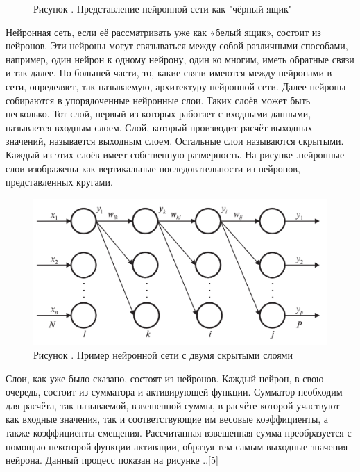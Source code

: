{  \begin{figure}
    \centering
    \def\svgwidth{\textwidth}
    
    \caption*{\gostFont Рисунок \thechaptercntr .\theimagecntr \spc {--} Представление нейронной сети как "чёрный ящик"}
    \label{fig:NNBlackBox}
  \end{figure} \addtocounter{imagecntr}{1}

  \par \redline Нейронная сеть, если её рассматривать уже как «белый ящик», состоит из нейронов. Эти нейроны могут связываться между собой различными способами, например, один нейрон к одному нейрону, один ко многим, иметь обратные связи и так далее. По большей части, то, какие связи имеются между нейронами в сети, определяет, так называемую, архитектуру нейронной сети. Далее нейроны собираются в упорядоченные нейронные слои. Таких слоёв может быть несколько. Тот слой, первый из которых работает с входными данными, называется входным слоем. Слой, который производит расчёт выходных значений, называется выходным слоем. Остальные слои называются скрытыми. Каждый из этих слоёв имеет собственную размерность. На рисунке \thechaptercntr .\theimagecntr \spc нейронные слои изображены как вертикальные последовательности из нейронов, представленных кругами.

  \begin{figure}[H]
    \centering
    \def\svgwidth{\textwidth}
    \includegraphics[width=155mm]{images/NNWhiteBox.png}
    \caption*{\gostFont Рисунок \thechaptercntr .\theimagecntr \spc {--} Пример нейронной сети с двумя скрытыми слоями}
    \label{fig:NNWhiteBox}
  \end{figure} \addtocounter{imagecntr}{1}

  \par \redline Слои, как уже было сказано, состоят из нейронов. Каждый нейрон, в свою очередь, состоит из сумматора и активирующей функции. Сумматор необходим для расчёта, так называемой, взвешенной суммы, в расчёте которой участвуют как входные значения, так и соответствующие им весовые коэффициенты, а также коэффициенты смещения. Рассчитанная взвешенная сумма преобразуется с помощью некоторой функции активации, образуя тем самым выходные значения нейрона. Данный процесс показан на рисунке \thechaptercntr .\theimagecntr.[5]

}
